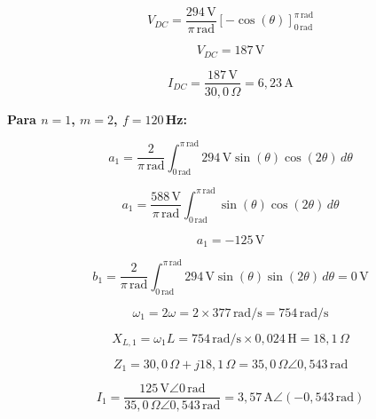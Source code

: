 \documentclass[12pt,a4paper]{article}
\begin{document}
\begin{equation}
    V_{DC} = \frac{294\,\text{V}}{\pi\,\text{rad}}\left[-\cos(\theta)\right]_{0\,\text{rad}}^{\pi\,\text{rad}}
\end{equation}

\begin{equation}
    \boxed{V_{DC} = 187\,\text{V}}
\end{equation}

\begin{equation}
    I_{DC} = \frac{187\,\text{V}}{30{,}0\,\Omega} = \boxed{6{,}23\,\text{A}}
\end{equation}

\textbf{Para $n=1$, $m=2$, $f=120$\,Hz:}

\begin{equation}
    a_1 = \frac{2}{\pi\,\text{rad}} \int_{0\,\text{rad}}^{\pi\,\text{rad}} 294\,\text{V}\sin(\theta)\cos(2\theta)\,d\theta
\end{equation}

\begin{equation}
    a_1 = \frac{588\,\text{V}}{\pi\,\text{rad}} \int_{0\,\text{rad}}^{\pi\,\text{rad}} \sin(\theta)\cos(2\theta)\,d\theta
\end{equation}

\begin{equation}
    a_1 = -125\,\text{V}
\end{equation}

\begin{equation}
    b_1 = \frac{2}{\pi\,\text{rad}} \int_{0\,\text{rad}}^{\pi\,\text{rad}} 294\,\text{V}\sin(\theta)\sin(2\theta)\,d\theta = 0\,\text{V}
\end{equation}

\begin{equation}
    \omega_1 = 2\omega = 2 \times 377\,\text{rad/s} = 754\,\text{rad/s}
\end{equation}

\begin{equation}
    X_{L,1} = \omega_1 L = 754\,\text{rad/s} \times 0{,}024\,\text{H} = 18{,}1\,\Omega
\end{equation}

\begin{equation}
    Z_1 = 30{,}0\,\Omega + j18{,}1\,\Omega = 35{,}0\,\Omega \angle 0{,}543\,\text{rad}
\end{equation}

\begin{equation}
    I_1 = \frac{125\,\text{V}\angle 0\,\text{rad}}{35{,}0\,\Omega \angle 0{,}543\,\text{rad}} = 3{,}57\,\text{A}\angle(-0{,}543\,\text{rad})
\end{equation}
\end{document}
